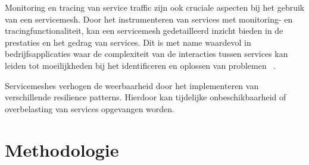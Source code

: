 Monitoring en tracing van service traffic zijn ook cruciale aspecten bij het gebruik van een servicemesh. Door het instrumenteren van services met monitoring- en tracingfunctionaliteit, kan een servicemesh gedetailleerd inzicht bieden in de prestaties en het gedrag van services. Dit is met name waardevol in bedrijfsapplicaties waar de complexiteit van de interacties tussen services kan leiden tot moeilijkheden bij het identificeren en oplossen van problemen \linebreak ~\autocite{Ciobotaru2021}.

Servicemeshes verhogen de weerbaarheid door het implementeren van verschillende resilience patterns. Hierdoor kan tijdelijke onbeschikbaarheid of overbelasting van services opgevangen worden.



\section{Methodologie}%
\label{sec:methodologie}

